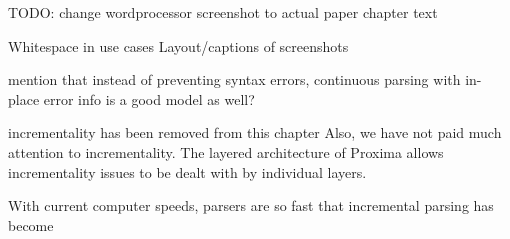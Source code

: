 \documentclass{speauth}
\begin{document}
\bc

TODO: change wordprocessor screenshot to actual paper chapter text

Whitespace in use cases
Layout/captions of screenshots


mention that instead of preventing syntax errors, continuous parsing with in-place error 
info is a good model as well?

incrementality  has been removed from this chapter
Also, we have not paid much attention to incrementality. The layered architecture of Proxima allows incrementality issues to be dealt with by individual layers. 

With current computer speeds, parsers are so fast that incremental parsing has become %
\ec

\newcommand{\editScrshot}[3]{\fbox{%
\parbox{#1mm}{
\begin{center} #2\\
{\vspace{3mm}\small #3}
\end{center}
}}}
\newcommand{\thenn}{\hspace{1mm}$\Rightarrow$\hspace{1mm}}


\newcommand{\editStepScrshot}[4]{%
\begin{center}
\hspace{\stretch{1}}\fbox{
\begin{tabular}[c]{@{}c@{}} \\ [-3mm]
#1 \\ [1mm]
\end{tabular}
}
\thenn
\fbox{
\begin{tabular}[c]{@{}c@{}} \\ [-3mm]
#2 \\ [1mm]
\end{tabular}
} \hspace*{\stretch{1}} \nopagebreak[4] \\ [3mm]
\nopagebreak[4] \hspace*{#3}{#4}\\
\end{center}}

\newcommand{\editStepScrshotChk}[4]{%
\editStepScrshot{#1}{#2}{#3}{#4}
\begin{center}
$\Rightarrow$\\
{#4}
\end{center}
}
\end{document}
